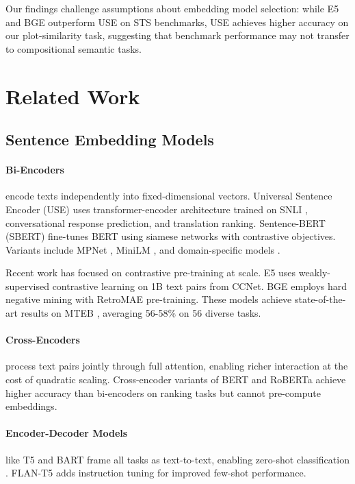 \documentclass[11pt,a4paper]{article}
\begin{document}
Our findings challenge assumptions about embedding model selection: while E5 and BGE outperform USE on STS benchmarks, USE achieves higher accuracy on our plot-similarity task, suggesting that benchmark performance may not transfer to compositional semantic tasks.

\section{Related Work}

\subsection{Sentence Embedding Models}

\paragraph{Bi-Encoders} encode texts independently into fixed-dimensional vectors. Universal Sentence Encoder (USE) \cite{Cer2018} uses transformer-encoder architecture trained on SNLI \cite{Bowman2015}, conversational response prediction, and translation ranking. Sentence-BERT (SBERT) \cite{Reimers2019} fine-tunes BERT \cite{Devlin2019} using siamese networks with contrastive objectives. Variants include MPNet \cite{Song2020}, MiniLM \cite{Wang2020}, and domain-specific models \cite{Gao2021SimCSE}.

Recent work has focused on contrastive pre-training at scale. E5 \cite{Wang2022} uses weakly-supervised contrastive learning on 1B text pairs from CCNet. BGE \cite{Xiao2023} employs hard negative mining with RetroMAE \cite{Liu2022RetroMAE} pre-training. These models achieve state-of-the-art results on MTEB \cite{Muennighoff2023MTEB}, averaging 56-58\% on 56 diverse tasks.

\paragraph{Cross-Encoders} \cite{Humeau2020Poly} process text pairs jointly through full attention, enabling richer interaction at the cost of quadratic scaling. Cross-encoder variants of BERT and RoBERTa \cite{Liu2019RoBERTa} achieve higher accuracy than bi-encoders on ranking tasks \cite{Nogueira2019PassageReranking} but cannot pre-compute embeddings.

\paragraph{Encoder-Decoder Models} like T5 \cite{Raffel2020T5} and BART \cite{Lewis2020BART} frame all tasks as text-to-text, enabling zero-shot classification \cite{Sanh2022Multitask}. FLAN-T5 \cite{Chung2022FLAN} adds instruction tuning for improved few-shot performance.
\end{document}
